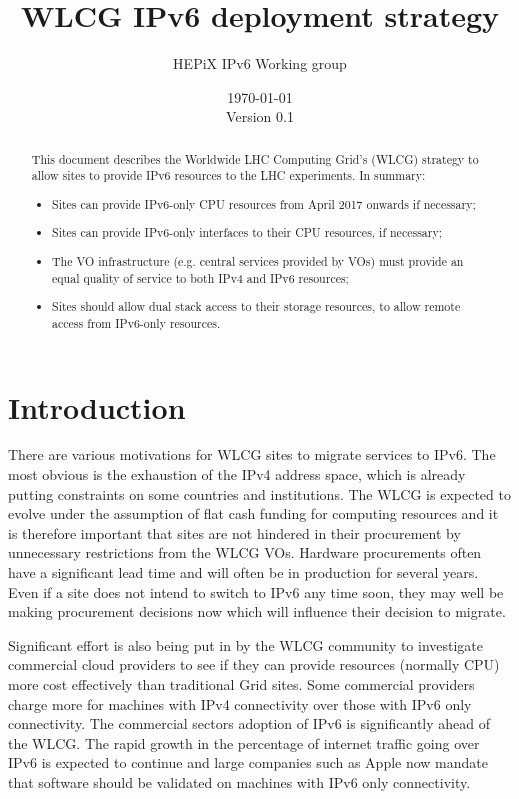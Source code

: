 \documentclass[11pt]{article}
\begin{document}
\title{WLCG IPv6 deployment strategy}
\author{HEPiX IPv6 Working group}
\date{\today \\ Version 0.1}
\maketitle

\renewcommand{\abstractname}{Executive Summary}
\begin{abstract}
This document describes the Worldwide LHC Computing Grid's (WLCG) strategy to allow sites to provide IPv6 resources to the LHC experiments. In summary:
\begin{itemize}
\item Sites can provide IPv6-only CPU resources from April 2017 onwards if necessary;
\item Sites can provide IPv6-only interfaces to their CPU resources, if necessary;
\item The VO infrastructure (e.g. central services provided by VOs) must provide an equal quality of service to both IPv4 and IPv6 resources;
\item Sites should allow dual stack access to their storage resources, to allow remote access from IPv6-only resources.
\end{itemize}
\end{abstract}

\newpage
\tableofcontents
\newpage

\section{Introduction}
There are various motivations for WLCG sites to migrate services to IPv6. The most obvious is the exhaustion of the IPv4 address space, which is already putting constraints on some countries and institutions. The WLCG is expected to evolve under the assumption of flat cash funding for computing resources and it is therefore important that sites are not hindered in their procurement by unnecessary restrictions from the WLCG VOs. Hardware procurements often have a significant lead time and will often be in production for several years.  Even if a site does not intend to switch to IPv6 any time soon, they may well be making procurement decisions now which will influence their decision to migrate.

Significant effort is also being put in by the WLCG community to investigate commercial cloud providers to see if they can provide resources (normally CPU) more cost effectively than traditional Grid sites.  Some commercial providers charge more for machines with IPv4 connectivity over those with IPv6 only connectivity\cite{CheapIPv6}.  The commercial sectors adoption of IPv6 is significantly ahead of the WLCG.  The rapid growth in the percentage of internet traffic going over IPv6 is expected to continue and large companies such as Apple now mandate that software should be validated on machines with IPv6 only connectivity\cite{ApplePolicy}.
\end{document}
